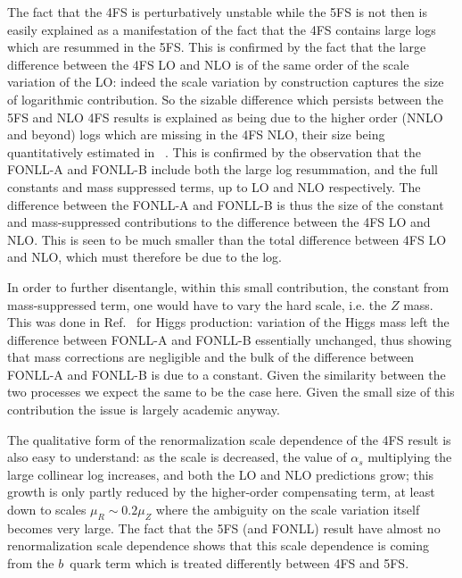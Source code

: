 \documentclass[12pt]{article}
\begin{document}
The fact that the 4FS is perturbatively unstable while the 5FS is not
then is easily explained as a manifestation of the fact that the 4FS
contains large logs which are resummed in the 5FS. This is confirmed
by the fact that the large difference between the 4FS LO and NLO is of
the same order of the scale variation of the LO: indeed the scale
variation by construction captures the size of logarithmic
contribution. So the sizable difference which persists between the 5FS
and NLO 4FS results is explained as being due to the higher order
(NNLO and beyond) logs
which are missing in the 4FS NLO, their size being quantitatively estimated
in ~\cite{Lim:2016wjo}. This is  confirmed by the observation
that the FONLL-A and FONLL-B include both the large log resummation,
and the full constants and mass suppressed terms, up to LO and NLO
respectively. The difference  between the FONLL-A and FONLL-B is thus
the size of the constant and mass-suppressed contributions to the
difference between the 4FS LO and NLO. This is seen to be much smaller
than the total difference between 4FS LO and NLO, which must therefore
be due to the log.

In order to further disentangle, within this small contribution, 
the constant from mass-suppressed term,
one would have to vary the hard scale, i.e. the $Z$ mass. This was
done in Ref.~\cite{Forte:2016sja} for Higgs production: variation of
the Higgs mass left the difference between FONLL-A and FONLL-B
essentially unchanged, thus showing that mass corrections are
negligible and the bulk of the difference between FONLL-A and FONLL-B
is due to a constant. Given the similarity between the two processes
we expect the same to be the case here. Given the small size of this
contribution the issue is largely academic anyway.

The qualitative form of the renormalization scale dependence of the 4FS
result is also easy to understand: as the scale is decreased, the
value of $\alpha_s$ multiplying the large collinear log increases, and
both the LO and NLO predictions grow; this growth is only partly
reduced by the higher-order compensating term, at least down to
scales $\mu_R\sim 0.2\mu_Z$ where the ambiguity on the scale variation
itself becomes very large. The fact  that the 5FS (and FONLL) result
have almost no renormalization scale dependence shows that this scale
dependence is coming from the $b$~quark term which is treated differently
between 4FS and 5FS.
\end{document}
